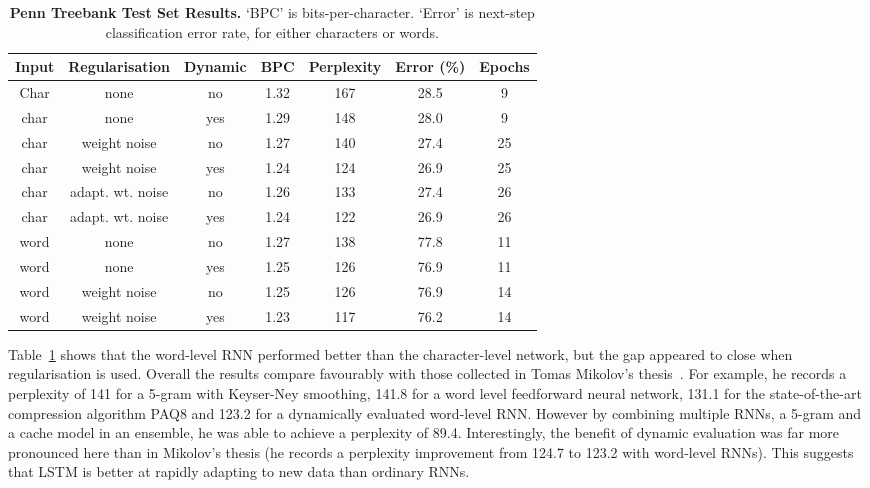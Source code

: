 \documentclass{article}
\newcommand{\tlabel}[1]{\label{tab:#1}}
\newcommand{\tref}[1]{Table~\ref{tab:#1}}
\newcommand{\capt}[2]{\caption[#1]{\textbf{#1}#2}}
\begin{document}
\begin{table}
\centering
\capt{Penn Treebank Test Set Results.}{ `BPC' is bits-per-character. `Error' is next-step classification error rate, for either characters or words.}
\tlabel{penn}
\vskip 0.15in
\begin{center}
\begin{footnotesize}
\begin{sc}\begin{tabular}{ccccccc}
\hline
Input & Regularisation & Dynamic & BPC & Perplexity & Error (\%) & Epochs\\
\hline
Char  & none  & no      & 1.32 & 167 & 28.5 & 9\\
char  & none  & yes     & 1.29 & 148  & 28.0 & 9\\
char  & weight noise  & no      & 1.27 & 140 & 27.4 & 25\\
char  & weight noise  & yes     & 1.24 & 124 & 26.9 & 25\\
char  & adapt. wt. noise  & no      & 1.26 & 133 & 27.4 & 26\\
char  & adapt. wt. noise  & yes     & 1.24 & 122 & 26.9 & 26\\
word  & none  & no      & 1.27    & 138 & 77.8 & 11\\
word  & none  & yes     & 1.25       & 126 & 76.9 & 11\\
word  & weight noise & no      & 1.25       & 126 & 76.9 & 14\\
word  & weight noise & yes     & 1.23       & 117 & 76.2 & 14\\
\hline
\end{tabular}
\end{sc}
\end{footnotesize}
\end{center}
\vskip -0.1in
\end{table}

\tref{penn} shows that the word-level RNN performed better than the character-level network, but the gap appeared to close when regularisation is used.
Overall the results compare favourably with those collected in Tomas Mikolov's thesis~\cite{mikolov12thesis}.
For example, he records a perplexity of 141 for a 5-gram with Keyser-Ney smoothing, 141.8 for a word level feedforward neural network, 131.1 for the state-of-the-art compression algorithm PAQ8 and 123.2 for a dynamically evaluated word-level RNN.
However by combining multiple RNNs, a 5-gram and a cache model in an ensemble, he was able to achieve a  perplexity of 89.4.
Interestingly, the benefit of dynamic evaluation was far more pronounced here than in Mikolov's thesis (he records a perplexity improvement from 124.7 to 123.2 with word-level RNNs).
This suggests that LSTM is better at rapidly adapting to new data than ordinary RNNs.
\end{document}
